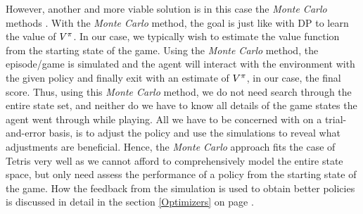 However, another and more viable solution is in this 
case the \textit{Monte Carlo} methods \citep{Csaba}. 
With the \textit{Monte Carlo} method, the goal is just like with DP
to learn
the value of $V^{\pi}$. In our case, 
we typically wish to estimate the value function from the starting 
state of the game. Using the \textit{Monte Carlo} method, the episode/game is simulated 
and the agent will interact with the environment with the given policy
and finally exit with an estimate of $V^{\pi}$,
in our case, the final score. Thus, using this \textit{Monte Carlo} method, we do not need search 
through the entire state set, and neither do we have to know all
details of the game states the agent went through while playing.
All we have to be concerned with on a trial-and-error basis, is to
adjust the policy and use the simulations to reveal what adjustments 
are beneficial.
Hence, the \textit{Monte Carlo} approach fits the case of Tetris
very well as we cannot afford to comprehensively  model the entire 
state space, but only need assess the performance of a policy from the 
starting state of the game.
How the feedback from the simulation is used to obtain better policies
is discussed in detail in the section 
\ref{Optimizers} on page \pageref{Optimizers}.










 



